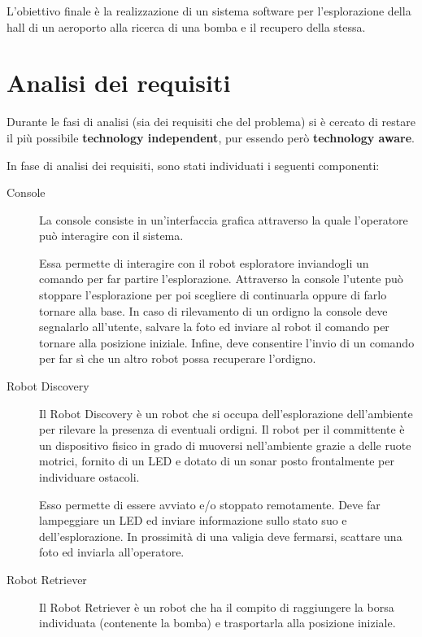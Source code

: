 \documentclass{llncs}
\newcommand{\labelsec}[1]{\label{sec:#1}}
\begin{document}
L'obiettivo finale è la realizzazione di un sistema software per l'esplorazione della hall di un aeroporto alla ricerca di una bomba e il recupero della stessa.

\section{Analisi dei requisiti}\labelsec{req_analysis}

Durante le fasi di analisi (sia dei requisiti che del problema) si è cercato di restare il più possibile \textbf{technology independent}, pur essendo però \textbf{technology aware}.

In fase di analisi dei requisiti, sono stati individuati i seguenti componenti:

\begin{description}
  \item[Console]
    La console consiste in un'interfaccia grafica attraverso la quale l'operatore può interagire con il sistema.

    Essa permette di interagire con il robot esploratore inviandogli un comando per far partire l'esplorazione.
    Attraverso la console l'utente può stoppare l'esplorazione per poi scegliere di continuarla oppure di farlo tornare alla base.
    In caso di rilevamento di un ordigno la console deve segnalarlo all'utente, salvare la foto ed inviare al robot il comando per tornare alla posizione iniziale.
    Infine, deve consentire l'invio di un comando per far sì che un altro robot possa recuperare l'ordigno.

  \item[Robot Discovery]
    Il Robot Discovery è un robot che si occupa dell'esplorazione dell'ambiente per rilevare la presenza di eventuali ordigni.
    Il robot per il committente è un dispositivo fisico in grado di muoversi nell'ambiente grazie a delle ruote motrici, fornito di un LED
    e dotato di un sonar posto frontalmente per individuare ostacoli.

    Esso permette di essere avviato e/o stoppato remotamente.
    Deve far lampeggiare un LED ed inviare informazione sullo stato suo e dell'esplorazione.
    In prossimità di una valigia deve fermarsi, scattare una foto ed inviarla all'operatore.

  \item[Robot Retriever]
    Il Robot Retriever è un robot che ha il compito di raggiungere la borsa individuata (contenente la bomba) e trasportarla alla posizione iniziale.
\end{description}
\end{document}

